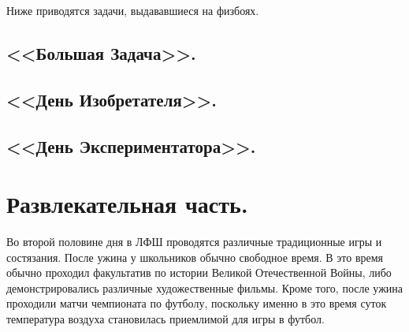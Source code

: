 \documentclass[12pt,a4paper,oneside]{scrartcl}
\begin{document}
Ниже приводятся задачи, выдававшиеся на физбоях. 










\restoregeometry
\subsection{<<Большая Задача>>.}
\label{sec:bz}

\subsection{<<День Изобретателя>>.}
\label{sec:day_inventor}

\subsection{<<День Экспериментатора>>.}
\label{sec:day_exp}


\section{Развлекательная часть.}
\label{sec:fun}

Во второй половине дня в ЛФШ проводятся различные традиционные игры и
состязания. После ужина у школьников обычно свободное время. В это
время обычно проходил факультатив по истории Великой Отечественной
Войны, либо демонстрировались различные художественные фильмы. Кроме
того, после ужина проходили матчи чемпионата по футболу, поскольку
именно в это время суток температура воздуха становилась приемлимой
для игры в футбол.
\end{document}

